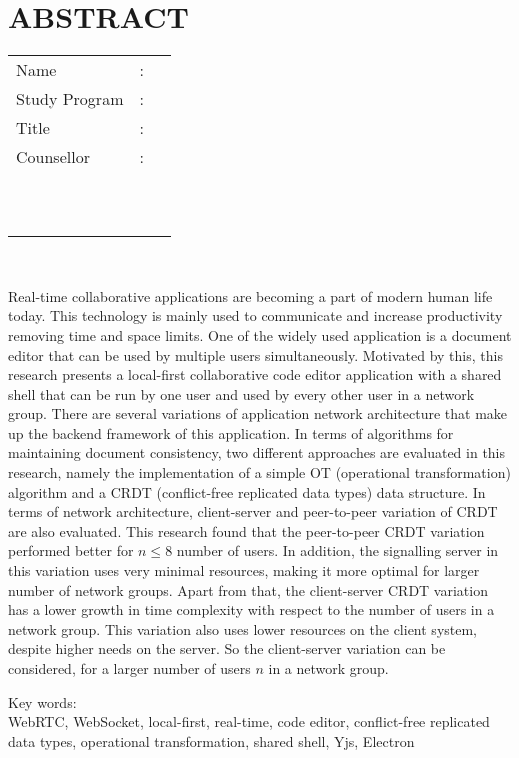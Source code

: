 %
%
%

\chapter*{ABSTRACT}
\singlespacing

\vspace*{0.2cm}

\def\blank{}

\noindent \begin{tabular}{l l p{11.0cm}}
	Name&: & \penulis \\
	Study Program&: & \studyProgram \\
	Title&: & \judulInggris \\
	Counsellor&: & \pembimbingSatu \\
	\ifx\blank\pembimbingDua
	\else
		\ &\ & \pembimbingDua \\
	\fi
	\ifx\blank\pembimbingTiga
	\else
		\ &\ & \pembimbingTiga \\
	\fi
\end{tabular} \\

\vspace*{0.5cm}

\noindent Real-time collaborative applications are becoming a part of modern human life today. This technology is mainly used to communicate and increase productivity removing time and space limits. One of the widely used application is a document editor that can be used by multiple users simultaneously. Motivated by this, this research presents a local-first collaborative code editor application with a shared shell that can be run by one user and used by every other user in a network group. There are several variations of application network architecture that make up the backend framework of this application. In terms of algorithms for maintaining document consistency, two different approaches are evaluated in this research, namely the implementation of a simple OT (operational transformation) algorithm and a CRDT (conflict-free replicated data types) data structure. In terms of network architecture, client-server and peer-to-peer variation of CRDT are also evaluated. This research found that the peer-to-peer CRDT variation performed better for $n \leq 8$ number of users. In addition, the signalling server in this variation uses very minimal resources, making it more optimal for larger number of network groups. Apart from that, the client-server CRDT variation has a lower growth in time complexity with respect to the number of users in a network group. This variation also uses lower resources on the client system, despite higher needs on the server. So the client-server variation can be considered, for a larger number of users $n$ in a network group. \\

\vspace*{0.2cm}

\noindent Key words: \\ WebRTC, WebSocket, local-first, real-time, code editor, conflict-free replicated data types, operational transformation, shared shell, Yjs, Electron \\

\newpage
